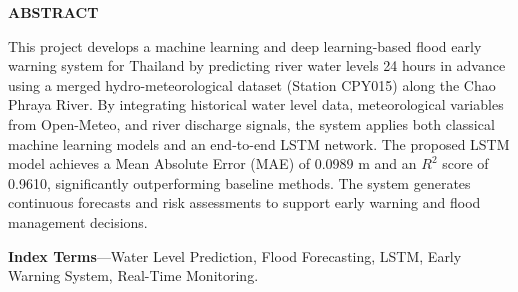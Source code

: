 {}

\begin{center}
    \large{\bf ABSTRACT}
\end{center}

\noindent
This project develops a machine learning and deep learning-based flood early warning system for Thailand by predicting river water levels 24 hours in advance using a merged hydro-meteorological dataset (Station CPY015) along the Chao Phraya River. By integrating historical water level data, meteorological variables from Open-Meteo, and river discharge signals, the system applies both classical machine learning models and an end-to-end LSTM network. The proposed LSTM model achieves a Mean Absolute Error (MAE) of 0.0989 m and an $R^2$ score of 0.9610, significantly outperforming baseline methods. The system generates continuous forecasts and risk assessments to support early warning and flood management decisions.

\vspace{0.5em}
\noindent \textbf{Index Terms}---Water Level Prediction, Flood Forecasting, LSTM, Early Warning System, Real-Time Monitoring.